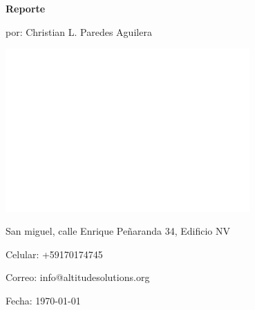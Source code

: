 \documentclass[10pt]{article}
\begin{document}
\selectfont

\pagecolor{blue!30!black!20!}
\begin{titlepage}
    \centering
    \vspace{2cm}
    
    {\Huge\bfseries Reporte\par}
    \vspace{1cm}
    
    {\Large por: Christian L. Paredes Aguilera\par}
    \vspace{4.5cm}

    \includegraphics[width=0.7\textwidth]{../image/logo.png}

    
    \vfill
    {\large San miguel, calle Enrique Peñaranda 34, Edificio NV\par}
    {\large Celular: +59170174745\par}
    {\large Correo: info@altitudesolutions.org\par}
    {\large Fecha: \today\par}
\end{titlepage}

\pagecolor{white}

\tableofcontents
\listoffigures
\listoftables
\end{document}
